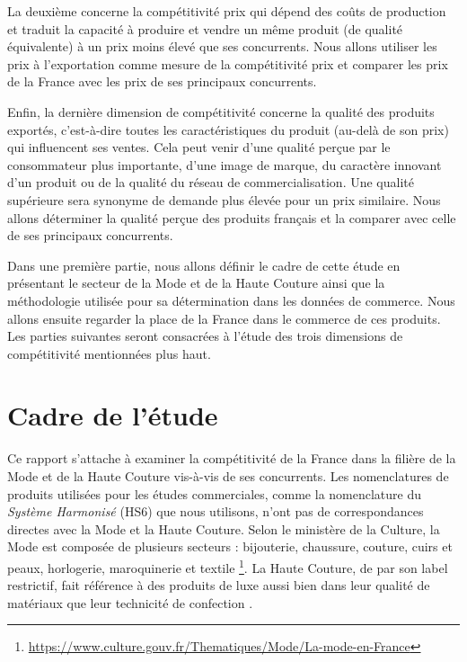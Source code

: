 \documentclass[french,10pt,a4paper]{article}
\begin{document}
La deuxième concerne la compétitivité prix qui dépend des coûts de production et traduit la capacité à produire et vendre un même produit (de qualité équivalente) à un prix moins élevé que ses concurrents. Nous allons utiliser les prix à l'exportation comme mesure de la compétitivité prix et comparer les prix de la France avec les prix de ses principaux concurrents.

Enfin, la dernière dimension de compétitivité concerne la qualité des produits exportés, c'est-à-dire toutes les caractéristiques du produit (au-delà de son prix) qui influencent ses ventes. Cela peut venir d'une qualité perçue par le consommateur plus importante, d'une image de marque, du caractère innovant d'un produit ou de la qualité du réseau de commercialisation. Une qualité supérieure sera synonyme de demande plus élevée pour un prix similaire. Nous allons déterminer la qualité perçue des produits français et la comparer avec celle de ses principaux concurrents.

\bigskip

Dans une première partie, nous allons définir le cadre de cette étude en présentant le secteur de la Mode et de la Haute Couture ainsi que la méthodologie utilisée pour sa détermination dans les données de commerce. Nous allons ensuite regarder la place de la France dans le commerce de ces produits. Les parties suivantes seront consacrées à l'étude des trois dimensions de compétitivité mentionnées plus haut.


\newpage

\section{Cadre de l'étude}

Ce rapport s'attache à examiner la compétitivité de la France dans la filière de la Mode et de la Haute Couture vis-à-vis de ses concurrents. Les nomenclatures de produits utilisées pour les études commerciales, comme la nomenclature du \textit{Système Harmonisé} (HS6) que nous utilisons, n'ont pas de correspondances directes avec la Mode et la Haute Couture. Selon le ministère de la Culture, la Mode est composée de plusieurs secteurs : bijouterie, chaussure, couture, cuirs et peaux, horlogerie, maroquinerie et textile \footnote{\href{https://www.culture.gouv.fr/Thematiques/Mode/La-mode-en-France}{https://www.culture.gouv.fr/Thematiques/Mode/La-mode-en-France}}. La Haute Couture, de par son label restrictif, fait référence à des produits de luxe aussi bien dans leur qualité de matériaux que leur technicité de confection \citep{Agogue2010}.
\end{document}
